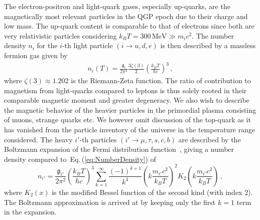 \documentclass[epjST]{svjour}
\newcommand{\req}[1]{Eq.\,(\ref{#1})}
\begin{document}
The electron-positron and light-quark gases, especially up-quarks, are the magnetically most relevant particles in the QGP epoch due to their charge and low mass. The up-quark content is comparable to that of electrons since both are very relativistic particles considering \(k_{B}T=300\,\mathrm{MeV}\gg m_i c^{2}\). {\color{blue}The number density \(n_{i}\) for the \(i\)-th light particle \((i\rightarrow u,d,e)\) is then described by a massless fermion gas given by~\cite{Letessier:2002ony}
\begin{align}
\label{eq:NumberDensity}
n_{i}(T) = \frac{\mathfrak{g}_{i}}{2\pi^{2}}\frac{3\zeta(3)}{2}\left(\frac{k_{B}T}{\hbar c}\right)^{3}\,,
\end{align}
}where \(\zeta(3)\approx1.202\) is the Riemann-Zeta function. The ratio of contribution to magnetism from light-quarks compared to leptons is thus solely rooted in their comparable magnetic moment and greater degeneracy. {\color{blue} We also wish to describe the magnetic behavior of the heavier particles in the primordial plasma consisting of muons, strange quarks etc. We however omit discussion of the top-quark as it has vanished from the particle inventory of the universe in the temperature range considered. The heavy \(i'\)-th particles \((i'\rightarrow \mu,\tau,s,c,b)\) are described by the Boltzmann expansion of the Fermi distribution function~\cite{Letessier:2002ony,Yang:2024ret}, giving a number density compared to~\req{eq:NumberDensity} of
\begin{equation}
 \label{eq:HeavyNumberDensity}
 n_{i'} = \frac{\mathfrak{g}_{i'}}{2\pi^{2}}\left(\frac{k_{B}T}{\hbar c}\right)^{3}\sum_{k=1}^{\infty}\frac{(-1)^{k+1}}{k^4}\left(k\frac{m_{i'}c^{2}}{k_{B}T}\right)^{2}K_{2}\left(k\frac{m_{i'}c^{2}}{k_{B}T}\right)\,,
\end{equation}
where \(K_{2}(x)\) is the modified Bessel function of the second kind (with index 2). The Boltzmann approximation is arrived at by keeping only the first \(k=1\) term in the expansion.}
\end{document}

